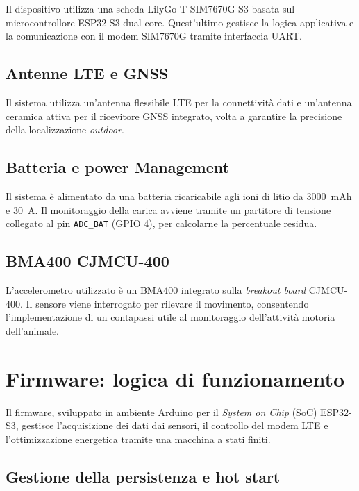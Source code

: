 \documentclass[12pt,a4paper]{article}
\begin{document}
Il dispositivo utilizza una scheda LilyGo T-SIM7670G-S3 \cite{lilygo_specs} basata sul microcontrollore ESP32-S3 dual-core.
Quest'ultimo gestisce la logica applicativa e la comunicazione con il modem SIM7670G tramite interfaccia UART.

\subsection{Antenne LTE e GNSS}

Il sistema utilizza un'antenna flessibile LTE \cite{LTE} per la connettività dati e un'antenna ceramica attiva \cite{GPS} per il ricevitore GNSS integrato, volta a garantire la precisione della localizzazione \textit{outdoor}.

\subsection{Batteria e power Management}

Il sistema è alimentato da una batteria ricaricabile agli ioni di litio da 3000~mAh e 30~A. Il monitoraggio della carica avviene tramite un partitore di tensione collegato al pin \texttt{ADC\_BAT} (GPIO 4), per calcolarne la percentuale residua.

\subsection{BMA400 CJMCU-400}

L'accelerometro utilizzato è un BMA400 \cite{bma400} integrato sulla \textit{breakout board} CJMCU-400. Il sensore viene interrogato per rilevare il movimento, consentendo l'implementazione di un contapassi utile al monitoraggio dell'attività motoria dell'animale.

\section{Firmware: logica di funzionamento}

Il firmware, sviluppato in ambiente Arduino per 
il \textit{System on Chip} (SoC) ESP32-S3, 
gestisce l'acquisizione dei dati dai sensori, 
il controllo del modem LTE e l'ottimizzazione energetica 
tramite una macchina a stati finiti.

\subsection{Gestione della persistenza e hot start}
\end{document}
